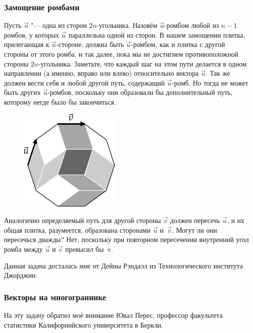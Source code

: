 \documentclass[twoside]{book}
\begin{document}
\subsubsection*{Замощение ромбами}%

Пусть $\vec u$ "--- одна из сторон $2n$-угольника.
Назовём $\vec u$-ромбом любой из $n-1$ ромбов, у которых $\vec u$ параллельна одной из сторон.
В нашем замощении плитка, прилегающая к $\vec u$-стороне, должна быть $\vec u$-ромбом, как и плитка с другой стороны от этого ромба, и так далее, пока мы не достигнем противоположной стороны $2n$-угольника.
Заметьте, что каждый шаг на этом пути делается в одном направлении (а именно, вправо или влево) относительно вектора $\vec u$. 
Так же должен вести себя и любой другой путь, содержащий $\vec u$-ромб.
Но тогда не может быть других $\vec u$-ромбов, поскольку они образовали бы дополнительный путь, которому негде было бы закончиться.

\begin{figure}[!ht]
\centering
\includegraphics{mp/wink-14} 
\end{figure}

Аналогично определяемый путь для другой стороны $\vec v$ должен пересечь $\vec u$, и их общая плитка, разумеется, образована сторонами $\vec u$ и~$\vec v$.
Могут ли они пересечься дважды?
Нет, поскольку при повторном пересечении внутренний угол ромба между $\vec u$ и $\vec v$ превысил бы~$\pi$. \heart

Данная задача досталась мне от Дейны Рэндалл из Технологического института Джорджии.

\subsubsection*{Векторы на многограннике}%

На эту задачу обратил моё внимание Ювал Перес, профессор факультета статистики Калифорнийского университета в Беркли. %
\end{document}
